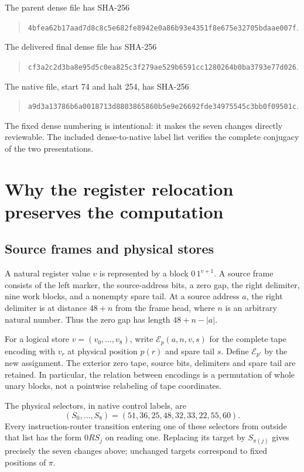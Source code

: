 \documentclass[11pt,letterpaper]{article}
\begin{document}
The parent dense file has SHA-256
\begin{quote}\small\nolinkurl{4bfea62b17aad7d8c8c5e682fe8942e0a86b93e4351f8e675e32705bdaae007f}.\end{quote}
The delivered final dense file has SHA-256
\begin{quote}\small\nolinkurl{cf3a2c2d3ba8e95d5c0ea825c3f279ae529b6591cc1280264b0ba3793e77d026}.\end{quote}
The native file, start 74 and halt 254, has SHA-256
\begin{quote}\small\nolinkurl{a9d3a13786b6a0018713d8803865860b5e9e26692fde34975545c3bb0f09501c}.\end{quote}
The fixed dense numbering is intentional: it makes the seven changes
directly reviewable. The included dense-to-native label list verifies
the complete conjugacy of the two presentations.

\section{Why the register relocation preserves the computation}
\label{sec:transport}

\subsection{Source frames and physical stores}

A natural register value $v$ is represented by a block $0\,1^{v+1}$.
A source frame consists of the left marker, the source-address bits,
a zero gap, the right delimiter, nine work blocks, and a nonempty
spare tail. At a source address $a$, the right delimiter is at
distance $48+n$ from the frame head, where $n$ is an arbitrary
natural number. Thus the zero gap has length $48+n-|a|$.

For a logical store $v=(v_0,\ldots,v_8)$, write
$\mathcal E_p(a,n,v,s)$ for the complete tape encoding with
$v_r$ at physical position $p(r)$ and spare tail $s$.
Define $\mathcal E_{p'}$ by the new assignment. The exterior zero
tape, source bits, delimiters and spare tail are retained. In
particular, the relation between encodings is a permutation of
whole unary blocks, not a pointwise relabeling of tape coordinates.

The physical selectors, in native control labels, are
\[
 (S_0,\ldots,S_8)=(51,36,25,48,32,33,22,55,60).
\]
Every instruction-router transition entering one of these selectors
from outside that list has the form $0R S_j$ on reading one.
Replacing its target by $S_{\pi(j)}$ gives precisely the seven
changes above; unchanged targets correspond to fixed positions
of $\pi$.
\end{document}
